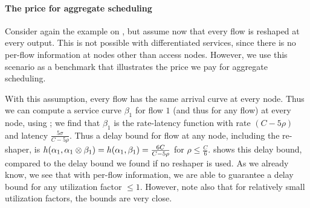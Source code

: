 
\paragraph{The price for aggregate scheduling}
Consider again the example on , but assume now
that every flow is reshaped at every output. This is not possible
with differentiated services, since there is no per-flow
information at nodes other than access nodes. However, we use this
scenario as a benchmark that illustrates the price we pay for
aggregate scheduling.

With this assumption, every flow has the same arrival curve at
every node. Thus we can compute a service curve $\beta_1$ for flow
$1$ (and thus for any flow) at every node, using ;
we find that $\beta_1$ is the rate-latency function with rate $(C-
5 \rho)$ and latency $\frac{5 \sigma}{C-5 \rho}$. Thus a delay
bound for flow at any node, including the re-shaper, is
$h(\alpha_1, \alpha_1 \otimes \beta_1)= h(\alpha_1,
\beta_1)=\frac{6C}{C- 5 \rho}$ for $\rho \leq \frac{C}{6}$.
 shows this delay bound, compared to the delay
bound we found if no reshaper is used. As we already know, we see
that with per-flow information, we are able to guarantee a delay
bound for any utilization factor $\leq 1$. However, note also that
for relatively small utilization factors, the bounds are very
close.

